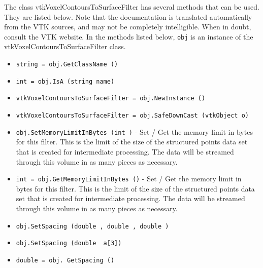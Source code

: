 The class vtkVoxelContoursToSurfaceFilter has several methods that can be used.
  They are listed below.
Note that the documentation is translated automatically from the VTK sources,
and may not be completely intelligible.  When in doubt, consult the VTK website.
In the methods listed below, \verb|obj| is an instance of the vtkVoxelContoursToSurfaceFilter class.
\begin{itemize}
\item  \verb|string = obj.GetClassName ()|

\item  \verb|int = obj.IsA (string name)|

\item  \verb|vtkVoxelContoursToSurfaceFilter = obj.NewInstance ()|

\item  \verb|vtkVoxelContoursToSurfaceFilter = obj.SafeDownCast (vtkObject o)|

\item  \verb|obj.SetMemoryLimitInBytes (int )| -  Set / Get the memory limit in bytes for this filter. This is the limit
 of the size of the structured points data set that is created for
 intermediate processing. The data will be streamed through this volume
 in as many pieces as necessary.

\item  \verb|int = obj.GetMemoryLimitInBytes ()| -  Set / Get the memory limit in bytes for this filter. This is the limit
 of the size of the structured points data set that is created for
 intermediate processing. The data will be streamed through this volume
 in as many pieces as necessary.

\item  \verb|obj.SetSpacing (double , double , double )|

\item  \verb|obj.SetSpacing (double  a[3])|

\item  \verb|double = obj. GetSpacing ()|

\end{itemize}
